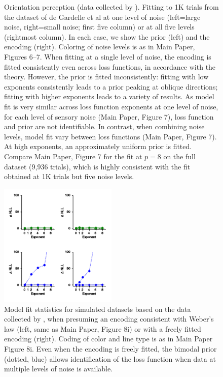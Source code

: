\documentclass[si.tex]{subfiles}
\begin{document}
\begin{figure}
\caption{Orientation perception (data collected by \citep{deGardelle2010AnOI}). Fitting to 1K trials from the dataset of de Gardelle et al at one level of noise (left=large noise, right=small noise; first five column) or at all five levels (rightmost column). In each case, we show the prior (left) and the encoding (right). Coloring of noise levels is as in Main Paper, Figures 6--7. When fitting at a single level of noise, the encoding is fitted consistently even across loss functions, in accordance with the theory. However, the prior is fitted inconsistently: fitting with low exponents consistently leads to a prior peaking at oblique directions; fitting with higher exponents leads to a variety of results. As model fit is very similar across loss function exponents at one level of noise, for each level of sensory noise (Main Paper, Figure 7), loss function and prior are not identifiable. In contrast, when combining noise levels, model fit vary between loss functions (Main Paper, Figure 7). At high exponents, an approximately uniform prior is fitted.
Compare Main Paper, Figure 7 for the fit at $p=8$ on the full dataset (9,936 trials), which is highly consistent with the fit obtained at 1K trials but five noise levels.
}
\label{fig:gardelle-one-level-pri-enc}
\end{figure}

\begin{figure}
\centering
\includegraphics[width=0.5\textwidth]{figure8_Rec_FreeSI.pdf}
\caption{Model fit statistics for simulated datasets based on the data collected by \citet{Remington2018LateBI}, when presuming an encoding consistent with Weber's law (left, same as Main Paper, Figure 8i) or with a freely fitted encoding (right).
Coding of color and line type is as in Main Paper Figure 8i.
Even when the encoding is freely fitted, the bimodal prior (dotted, blue) allows identification of the loss function when data at multiple levels of noise is available.
}\label{fig:remington-nll-free-or-weber}
\end{figure}
\end{document}
